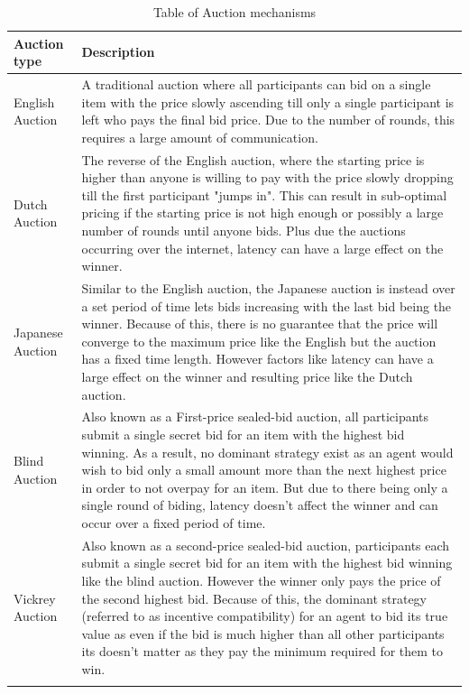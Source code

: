 \begin{longtable}{|p{3.5cm}|p{11cm}|} \hline
    \textbf{Auction type} & \textbf{Description} \\ \hline
    English Auction & A traditional auction where all participants can bid on a single item with the price slowly
        ascending till only a single participant is left who pays the final bid price. Due to the number of rounds,
        this requires a large amount of communication. \\ \hline

    Dutch Auction & The reverse of the English auction, where the starting price is higher than anyone is willing to
        pay with the price slowly dropping till the first participant "jumps in". This can result in sub-optimal pricing
        if the starting price is not high enough or possibly a large number of rounds until anyone bids. Plus due
        the auctions occurring over the internet, latency can have a large effect on the winner. \\ \hline

    Japanese Auction & Similar to the English auction, the Japanese auction is instead over a set period of time lets
        bids increasing with the last bid being the winner. Because of this, there is no guarantee that the price will
        converge to the maximum price like the English but the auction has a fixed time length. However factors like
        latency can have a large effect on the winner and resulting price like the Dutch auction. \\ \hline

    Blind Auction & Also known as a First-price sealed-bid auction, all participants submit a single secret bid for an
        item with the highest bid winning. As a result, no dominant strategy exist as an agent would wish to bid only a
        small amount more than the next highest price in order to not overpay for an item. But due to there being only
        a single round of biding, latency doesn't affect the winner and can occur over a fixed period of time. \\ \hline

    Vickrey Auction~\citep{vickrey} & Also known as a second-price sealed-bid auction, participants each submit
        a single secret bid for an item with the highest bid winning like the blind auction. However the winner only
        pays the price of the second highest bid. Because of this, the dominant strategy (referred to as incentive
        compatibility) for an agent to bid its true value as even if the bid is much higher than all other participants
        its doesn't matter as they pay the minimum required for them to win. \\ \hline
    \caption{Table of Auction mechanisms}
    \label{tab:auctions-descriptions}
\end{longtable}

